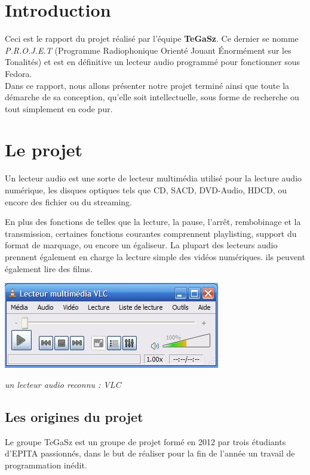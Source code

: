 \documentclass[12pt,a4paper]{report}
\begin{document}
\chapter{Introduction}

Ceci est le rapport du projet réalisé par l'équipe \textbf{TeGaSz}. 
Ce dernier se nomme \emph{P.R.O.J.E.T} (Programme Radiophonique Orienté Jouant Énormément sur les Tonalités) et est en définitive un lecteur audio programmé pour fonctionner sous Fedora. \\
Dans ce rapport, nous allons présenter notre projet terminé ainsi
que toute la démarche de sa conception, qu'elle soit intellectuelle, sous forme de 
recherche ou tout simplement en code pur.

\chapter{Le projet}
Un lecteur audio est une sorte de lecteur multimédia utilisé pour la lecture audio numérique, les disques optiques tels que CD, SACD, DVD-Audio, HDCD, ou encore  des fichier ou du streaming.

En plus des fonctions de telles que la lecture, la pause, l'arrêt, rembobinage et la transmission, certaines fonctions courantes comprennent playlisting, support du format de marquage, ou encore un égaliseur.
La plupart des lecteurs audio prennent également en charge la lecture simple des vidéos numériques. ils peuvent également lire des films.

\begin{center}
\includegraphics{vlc-interface1.jpg}

\it{un lecteur audio reconnu : VLC}
\end{center}

\section{Les origines du projet}

Le groupe TeGaSz est un groupe de projet formé en 2012 par trois étudiants
d'EPITA passionnés, dans le but de réaliser pour la fin de l'année un
travail de programmation inédit. 
\end{document}
